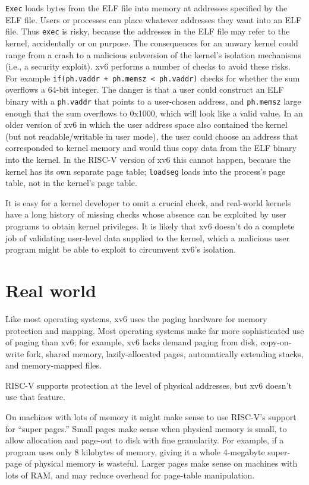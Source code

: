 \lstinline{Exec}
loads bytes from the ELF file into memory at addresses specified by the ELF file.
Users or processes can place whatever addresses they want into an ELF file.
Thus
\lstinline{exec}
is risky, because the addresses in the ELF file may refer to the kernel, accidentally
or on purpose. The consequences for an unwary kernel could range from
a crash to a malicious subversion of the kernel's isolation mechanisms
(i.e., a security exploit).
xv6 performs a number of checks to avoid these risks.
For example
\lstinline{if(ph.vaddr + ph.memsz < ph.vaddr)}
checks for whether the sum overflows a 64-bit integer.
The danger is that a user could construct an ELF binary with a
\lstinline{ph.vaddr}
that points to a user-chosen address,
and
\lstinline{ph.memsz}
large enough that the sum overflows to 0x1000, which will look like a
valid value. In an older version of xv6 in which the user address
space also contained the kernel (but not readable/writable in user
mode), the user could choose an address that corresponded to kernel
memory and would thus copy data from the ELF binary into the kernel.
In the RISC-V version of xv6 this cannot happen, because the kernel has
its own separate page table;
\lstinline{loadseg}
loads into the process's page table, not in the kernel's page table.

It is easy for a kernel developer to omit a crucial check, and
real-world kernels have a long history of missing checks whose absence
can be exploited by user programs to obtain kernel privileges.  It is likely that xv6 doesn't do a complete job of validating
user-level data supplied to the kernel, which a malicious user program might be able to exploit to circumvent xv6's isolation.
\section{Real world}

Like most operating systems, xv6 uses the paging hardware
for memory protection and mapping.
Most operating systems make far more sophisticated
use of paging than xv6; for example, xv6 lacks demand
paging from disk, copy-on-write fork, shared memory,
lazily-allocated pages,
automatically extending stacks, and memory-mapped files.

RISC-V supports protection at the level of physical addresses,
but xv6 doesn't use that feature.

On machines with lots of memory
it might make sense to use
RISC-V's support for ``super pages.''
Small pages make sense
when physical memory is small, to allow allocation and page-out to disk
with fine granularity.
For example, if a program
uses only 8 kilobytes of memory, giving it a whole 4-megabyte super-page
of physical memory is wasteful.
Larger pages make sense on machines with lots of RAM,
and may reduce overhead for page-table manipulation.

